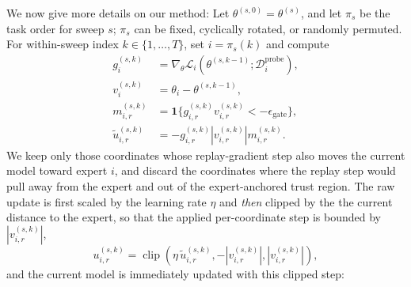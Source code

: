 \documentclass[11pt]{article}
\newcommand{\loss}{\mathcal{L}}
\newcommand{\data}{\mathcal{D}}
\newcommand{\ind}{\mathbf{1}}
\DeclareMathOperator{\clip}{clip}
\begin{document}

We now give more details on our method: Let $\theta^{(s,0)}=\theta^{(s)}$, and let $\pi_s$ be the task order for sweep $s$; $\pi_s$ can be fixed, cyclically rotated, or randomly permuted. For within-sweep index $k\in\{1,\ldots,T\}$, set $i=\pi_s(k)$ and compute
\begin{align}
    g_i^{(s,k)}
    &=
    \nabla_\theta \loss_i(\theta^{(s,k-1)};\data_i^{\mathrm{probe}}),
    \label{eq:sequential-gradient}\\
    v_i^{(s,k)}
    &=
    \theta_i - \theta^{(s,k-1)},
    \label{eq:sequential-direction}\\
    m_{i,r}^{(s,k)}
    &=
    \ind\{g_{i,r}^{(s,k)}v_{i,r}^{(s,k)} < -\epsilon_{\mathrm{gate}}\},
    \label{eq:sequential-mask}\\
    \widetilde u_{i,r}^{(s,k)}
    &=
    -g_{i,r}^{(s,k)}|v_{i,r}^{(s,k)}|m_{i,r}^{(s,k)}.
    \label{eq:sequential-raw-update}
\end{align}
We keep only those coordinates whose replay-gradient step also moves the current model toward expert $i$, and discard the coordinates where the replay step would pull away from the expert and out of the expert-anchored trust region.%
The raw update is first scaled by the learning rate $\eta$ and \emph{then} clipped by the the current distance to the expert, so that the applied per-coordinate step is bounded by $|v_{i,r}^{(s,k)}|$,
\begin{equation}
    u_{i,r}^{(s,k)}
    =
    \clip\!\left(
        \eta\,\widetilde u_{i,r}^{(s,k)},
        - |v_{i,r}^{(s,k)}|,
         |v_{i,r}^{(s,k)}|
    \right),
    \label{eq:clipped-update}
\end{equation}
and the current model is immediately updated with this clipped step:
\end{document}

